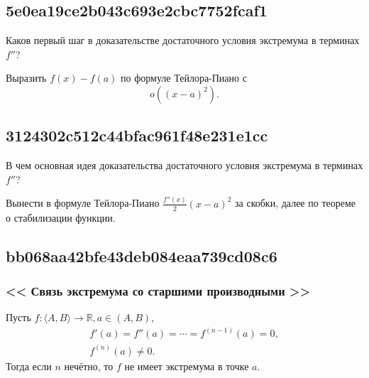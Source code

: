 \documentclass[11pt, a5paper]{article}
\newenvironment{note}[1]{\goodbreak\par\subsection{\hfill \color{lightgray}\tiny #1}}{}
\newenvironment{cloze}[2][\ldots]{\begin{leftbar}}{\end{leftbar}}
\newenvironment{icloze}[2][\ldots]{%
  \ignorespaces\text{\tiny \color{lightgray}\{#2} %
}{%
  \text{\tiny\color{lightgray}\}}\unskip%
}
\begin{document}
\begin{note}{5e0ea19ce2b043c693e2cbc7752fcaf1}
    Каков первый шаг в доказательстве достаточного условия экстремума в терминах \( f'' \)?

    \begin{cloze}{1}
        Выразить \( f(x) - f(a) \)  по формуле Тейлора-Пиано с
        \[
            o((x - a)^2 ).
        \]
    \end{cloze}
\end{note}

\begin{note}{3124302c512c44bfac961f48e231e1cc}
    В чем основная идея доказательства достаточного условия экстремума в терминах \( f'' \)?

    \begin{cloze}{1}
        Вынести в формуле Тейлора-Пиано \( \frac{f''(x)}{2} (x - a)^2  \) за скобки, далее по теореме о стабилизации функции.
    \end{cloze}
\end{note}

\begin{note}{bb068aa42bfe43deb084eaa739cd08c6}
    \subsubsection{<<\begin{icloze}{5}Связь экстремума со старшими производными\end{icloze}>>}

    Пусть \begin{icloze}{4}\( f : \langle A, B \rangle \to \mathbb R, a \in (A, B) \),\end{icloze}
    \begin{icloze}{3}\[
                         \begin{gathered}
                             f'(a) = f''(a) = \cdots = f^{(n - 1)}(a) = 0, \\
                             f^{(n)}(a) \neq 0.
                         \end{gathered}
                     \]\end{icloze}
    Тогда если \begin{icloze}{2}\( n \) нечётно,\end{icloze} то \begin{icloze}{1}\( f \) не имеет экстремума в точке \( a \).\end{icloze}
\end{note}
\end{document}
